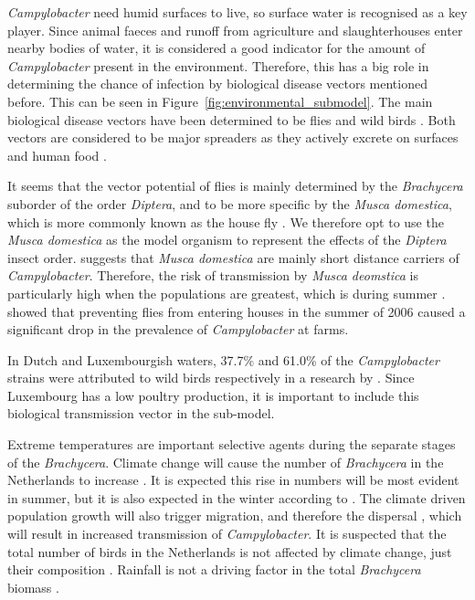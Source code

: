 \textit{Campylobacter} need humid surfaces to live, so surface water is recognised as a key player. Since animal faeces and runoff from agriculture and slaughterhouses enter nearby bodies of water, it is considered a good indicator for the amount of \textit{Campylobacter} present in the environment. Therefore, this has a big role in determining the chance of infection by biological disease vectors mentioned before. This can be seen in Figure~\ref{fig:environmental_submodel}. The main biological disease vectors have been determined to be flies and wild birds \parencite{mughini-gras_quantifying_2016}. Both vectors are considered to be major spreaders as they actively excrete  on surfaces and human food \parencite{french_molecular_2009, hald_influxed_2008}.

It seems that the vector potential of flies is mainly determined by the \textit{Brachycera} suborder of the order \textit{Diptera}, and to be more specific by the \textit{Musca domestica}, which is more commonly known as the house fly \parencite{hald_influxed_2008}. We therefore opt to use the \textit{Musca domestica} as the model organism to represent the effects of the \textit{Diptera} insect order. \cite{skovgard_retention_2011} suggests that \textit{Musca domestica} are mainly short distance carriers of \textit{Campylobacter}. Therefore, the risk of transmission by \textit{Musca deomstica} is particularly high when the populations are greatest, which is during summer \parencite{royden_role_2016}. \cite{hald_use_2007} showed that preventing flies from entering houses in the summer of 2006 caused a significant drop in the prevalence of \textit{Campylobacter} at farms.

In Dutch and Luxembourgish waters, 37.7\% and 61.0\% of the \textit{Campylobacter} strains were attributed to wild birds respectively in a research by \cite{mughini-gras_quantifying_2016}. Since Luxembourg has a low poultry production, it is important to include this biological transmission vector in the sub-model.

Extreme temperatures are important selective agents during the separate stages of the \textit{Brachycera}. Climate change will cause the number of \textit{Brachycera} in the Netherlands to increase \parencite{goulson_predicting_2005}. It is expected this rise in numbers will be most evident in summer, but it is also expected in the winter according to \citeauthor{goulson_predicting_2005}. The climate driven population growth will also trigger migration, and therefore the dispersal \parencite{feder_locomotion_2010}, which will result in increased transmission of \textit{Campylobacter}. It is suspected that the total number of birds in the Netherlands is not affected by climate change, just their composition \parencite{mclean_reduced_2020, knudsen_challenging_2011}. Rainfall is not a driving factor in the total \textit{Brachycera} biomass \parencite{goulson_predicting_2005}.

